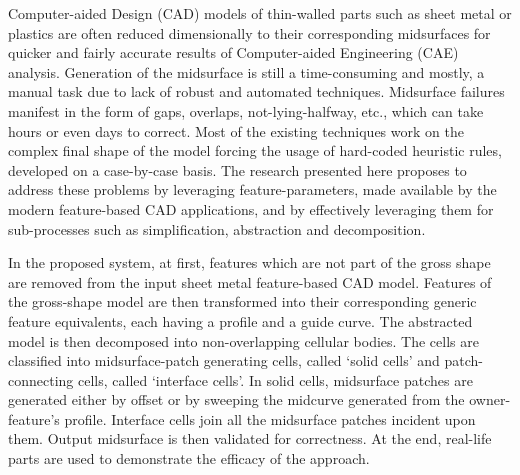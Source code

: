 Computer-aided Design (CAD) models of thin-walled parts such as sheet metal or plastics are often reduced dimensionally to their corresponding midsurfaces for quicker and fairly accurate results of Computer-aided Engineering (CAE) analysis. Generation of the midsurface is still a time-consuming and mostly, a manual task due to lack of robust and automated techniques.  Midsurface failures manifest in the form of gaps, overlaps, not-lying-halfway, etc., which can take hours or even days to correct. Most of the existing techniques work on the complex final shape of the model forcing the usage of hard-coded heuristic rules, developed on a case-by-case basis. The research presented here proposes to address these problems by leveraging feature-parameters, made available by the modern feature-based CAD applications, and by effectively leveraging them for sub-processes such as simplification, abstraction and decomposition. 

In the proposed system, at first, features which are not part of the gross shape are removed from the input sheet metal feature-based CAD model. Features of the gross-shape model are then transformed into their corresponding generic feature equivalents, each having a profile and a guide curve. The abstracted model is then decomposed into non-overlapping cellular bodies. The cells are classified into midsurface-patch generating cells, called `solid cells' and patch-connecting cells, called `interface cells'. In solid cells, midsurface patches are generated either by offset or by sweeping the midcurve generated from the owner-feature's profile. Interface cells join all the midsurface patches incident upon them. Output midsurface is then validated for correctness. At the end, real-life parts are used to demonstrate the efficacy of the approach.
